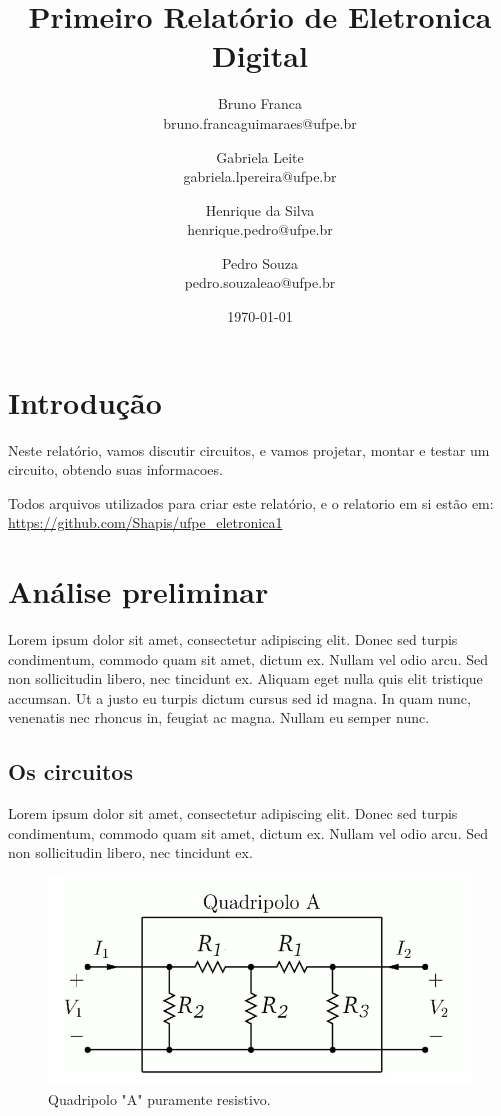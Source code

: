 \documentclass[12pt,twoside, a4paper, twocolumn]{article}
\title{Primeiro Relatório de Eletronica Digital}
\author{Bruno Franca \\ bruno.francaguimaraes@ufpe.br
\and Gabriela Leite \\ gabriela.lpereira@ufpe.br
\and Henrique da Silva \\ henrique.pedro@ufpe.br
\and Pedro Souza \\ pedro.souzaleao@ufpe.br}
\date{\today}
\begin{document}
\maketitle
{}
\newpage
\tableofcontents
\newpage




\section{Introdução}

Neste relatório, vamos discutir circuitos, e vamos projetar, montar e testar um circuito, obtendo suas informacoes.

Todos arquivos utilizados para criar este relatório, e o relatorio em si estão em:  \url{https://github.com/Shapis/ufpe_eletronica1}

\section{Análise preliminar}

Lorem ipsum dolor sit amet, consectetur adipiscing elit. Donec sed turpis condimentum, commodo quam sit amet, dictum ex. Nullam vel odio arcu. Sed non sollicitudin libero, nec tincidunt ex. Aliquam eget nulla quis elit tristique accumsan. Ut a justo eu turpis dictum cursus sed id magna. In quam nunc, venenatis nec rhoncus in, feugiat ac magna. Nullam eu semper nunc.

\subsection{Os circuitos}

Lorem ipsum dolor sit amet, consectetur adipiscing elit. Donec sed turpis condimentum, commodo quam sit amet, dictum ex. Nullam vel odio arcu. Sed non sollicitudin libero, nec tincidunt ex.

\begin{figure}[h]
    \centering
    \includegraphics[width=1\columnwidth]{images/quadripoloa.png}
    \caption{Quadripolo "A" puramente resistivo.}
\end{figure}
\end{document}
